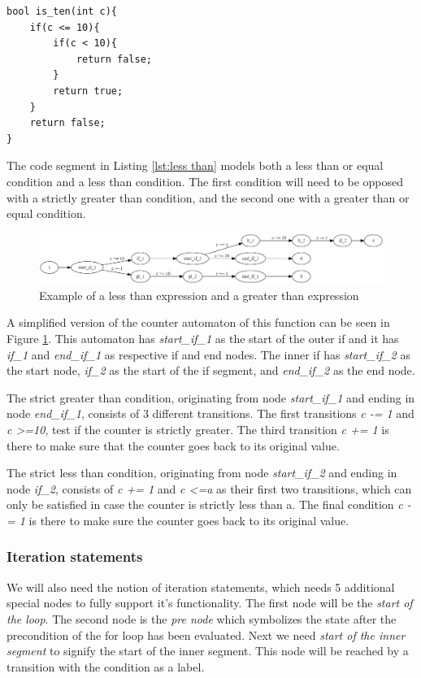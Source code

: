 \documentclass[12pt]{article}
\begin{document}
\begin{lstlisting}[style=CStyle, caption={Example of a code segment using less than and less than or equal conditions}, label={lst:less than}]
bool is_ten(int c){
	if(c <= 10){
		if(c < 10){
			return false;
		}
		return true;
	}
	return false;
}
\end{lstlisting}

The code segment in Listing \ref{lst:less than} models both a less than or equal condition and a less than condition. The first condition will need to be opposed with a strictly greater than condition, and the second one with a greater than or equal condition.

\begin{figure}[h]
	\centering
	\includegraphics[width=\linewidth]{less_than_greater_than}
	\caption{Example of a less than expression and a greater than expression}
	\label{fig:less_than_greater_than}
\end{figure}

A simplified version of the counter automaton of this function can be seen in Figure \ref{fig:less_than_greater_than}. This automaton has \textit{start\_if\_1} as the start of the outer if and it has \textit{if\_1} and \textit{end\_if\_1} as respective if and end nodes. The inner if has \textit{start\_if\_2} as the start node, \textit{if\_2} as the start of the if segment, and \textit{end\_if\_2} as the end node.

The strict greater than condition, originating from node \textit{start\_if\_1} and ending in node \textit{end\_if\_1}, consists of 3 different transitions. The first transitions \textit{c -= 1} and \textit{c \textgreater =10}, test if the counter is strictly greater. The third transition \textit{c += 1} is there to make sure that the counter goes back to its original value.

The strict less than condition, originating from node \textit{start\_if\_2} and ending in node \textit{if\_2}, consists of \textit{c += 1} and \textit{c \textless =a} as their first two transitions, which can only be satisfied in case the counter is strictly less than a. The final condition \textit{c -= 1} is there to make sure the counter goes back to its original value.

\subsubsection{Iteration statements}
We will also need the notion of iteration statements, which needs 5 additional special nodes to fully support it's functionality. The first node will be the \textit{start of the loop}. The second node is the \textit{pre node} which symbolizes the state after the precondition of the for loop has been evaluated. Next we need \textit{start of the inner segment} to signify the start of the inner segment. This node will be reached by a transition with the condition as a label. 
\end{document}
